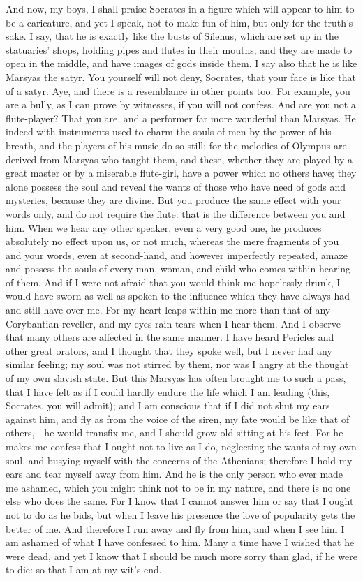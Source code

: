 \para[147] And now, my boys, I shall praise Socrates in a figure which will appear to him to be a caricature, and yet I speak, not to make fun of him, but only for the truth's sake. I say, that he is exactly like the busts of Silenus, which are set up in the statuaries' shops, holding pipes and flutes in their mouths; and they are made to open in the middle, and have images of gods inside them. I say also that he is like Marsyas the satyr. You yourself will not deny, Socrates, that your face is like that of a satyr. Aye, and there is a resemblance in other points too. For example, you are a bully, as I can prove by witnesses, if you will not confess. And are you not a flute-player? That you are, and a performer far more wonderful than Marsyas. He indeed with instruments used to charm the souls of men by the power of his breath, and the players of his music do so still: for the melodies of Olympus are derived from Marsyas who taught them, and these, whether they are played by a great master or by a miserable flute-girl, have a power which no others have; they alone possess the soul and reveal the wants of those who have need of gods and mysteries, because they are divine. But you produce the same effect with your words only, and do not require the flute: that is the difference between you and him. When we hear any other speaker, even a very good one, he produces absolutely no effect upon us, or not much, whereas the mere fragments of you and your words, even at second-hand, and however imperfectly repeated, amaze and possess the souls of every man, woman, and child who comes within hearing of them. And if I were not afraid that you would think me hopelessly drunk, I would have sworn as well as spoken to the influence which they have always had and still have over me. For my heart leaps within me more than that of any Corybantian reveller, and my eyes rain tears when I hear them. And I observe that many others are affected in the same manner. I have heard Pericles and other great orators, and I thought that they spoke well, but I never had any similar feeling; my soul was not stirred by them, nor was I angry at the thought of my own slavish state. But this Marsyas has often brought me to such a pass, that I have felt as if I could hardly endure the life which I am leading (this, Socrates, you will admit); and I am conscious that if I did not shut my ears against him, and fly as from the voice of the siren, my fate would be like that of others,---he would transfix me, and I should grow old sitting at his feet. For he makes me confess that I ought not to live as I do, neglecting the wants of my own soul, and busying myself with the concerns of the Athenians; therefore I hold my ears and tear myself away from him. And he is the only person who ever made me ashamed, which you might think not to be in my nature, and there is no one else who does the same. For I know that I cannot answer him or say that I ought not to do as he bids, but when I leave his presence the love of popularity gets the better of me. And therefore I run away and fly from him, and when I see him I am ashamed of what I have confessed to him. Many a time have I wished that he were dead, and yet I know that I should be much more sorry than glad, if he were to die: so that I am at my wit's end.

